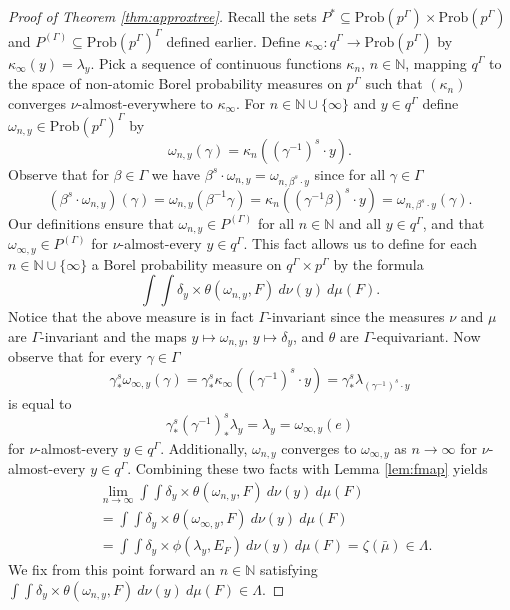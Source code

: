 \documentclass[12pt]{amsart}
\theoremstyle{definition}
\newcommand\bN{{\mathbb N}}
\newcommand{\Prob}{\mathrm{Prob}}
\begin{document}
\begin{proof}[Proof of Theorem \ref{thm:approxtree}]
	Recall the sets $P^* \subseteq \Prob(p^\Gamma) \times \Prob(p^\Gamma)$ and $P^{(\Gamma)} \subseteq \Prob(p^\Gamma)^\Gamma$ defined earlier. Define $\kappa_\infty : q^\Gamma \rightarrow \Prob(p^\Gamma)$ by $\kappa_\infty(y) = \lambda_y$. Pick a sequence of continuous functions $\kappa_n$, $n \in \bN$, mapping $q^\Gamma$ to the space of non-atomic Borel probability measures on $p^\Gamma$ such that $(\kappa_n)$ converges $\nu$-almost-everywhere to $\kappa_\infty$. For $n \in \bN \cup \{\infty\}$ and $y \in q^\Gamma$ define $\omega_{n,y} \in \Prob(p^\Gamma)^\Gamma$ by
	\[\omega_{n,y}(\gamma) = \kappa_n((\gamma^{-1})^s \cdot y).\]
	Observe that for $\beta \in \Gamma$ we have $\beta^s \cdot \omega_{n,y} = \omega_{n, \beta^s \cdot y}$ since for all $\gamma \in \Gamma$
	\[(\beta^s \cdot \omega_{n,y})(\gamma) = \omega_{n,y}(\beta^{-1} \gamma) = \kappa_n((\gamma^{-1} \beta)^s \cdot y) = \omega_{n, \beta^s \cdot y}(\gamma).\]
	Our definitions ensure that $\omega_{n,y} \in P^{(\Gamma)}$ for all $n \in \bN$ and all $y \in q^\Gamma$, and that $\omega_{\infty,y} \in P^{(\Gamma)}$ for $\nu$-almost-every $y \in q^\Gamma$. This fact allows us to define for each $n \in \bN \cup \{\infty\}$ a Borel probability measure on $q^\Gamma \times p^\Gamma$ by the formula
	\[\int \int \delta_y \times \theta(\omega_{n,y}, F) \ d \nu(y) \ d \mu(F).\]
	Notice that the above measure is in fact $\Gamma$-invariant since the measures $\nu$ and $\mu$ are $\Gamma$-invariant and the maps $y \mapsto \omega_{n,y}$, $y \mapsto \delta_y$, and $\theta$ are $\Gamma$-equivariant. Now observe that for every $\gamma \in \Gamma$
	\[\gamma^s_* \omega_{\infty,y}(\gamma) =  \gamma^s_* \kappa_\infty((\gamma^{-1})^s \cdot y) = \gamma^s_* \lambda_{(\gamma^{-1})^s \cdot y}\]
	is equal to
	\[\gamma^s_* (\gamma^{-1})^s_* \lambda_y = \lambda_y = \omega_{\infty, y}(e)\]
	for $\nu$-almost-every $y \in q^\Gamma$. Additionally, $\omega_{n,y}$ converges to $\omega_{\infty, y}$ as $n \rightarrow \infty$ for $\nu$-almost-every $y \in q^\Gamma$. Combining these two facts with Lemma \ref{lem:fmap} yields
	\begin{align*}
		& \lim_{n \rightarrow \infty} \int \int \delta_y \times \theta(\omega_{n,y}, F) \ d \nu(y) \ d \mu(F)\\
		& = \int \int \delta_y \times \theta(\omega_{\infty,y}, F) \ d \nu(y) \ d \mu(F)\\
		& = \int \int \delta_y \times \phi(\lambda_y, E_F) \ d \nu(y) \ d \mu(F) = \zeta(\bar \mu) \in \Lambda.
	\end{align*}
	We fix from this point forward an $n \in \bN$ satisfying $\int \int \delta_y \times \theta(\omega_{n,y}, F) \ d \nu(y) \ d \mu(F) \in \Lambda$.
	

\end{proof}
\end{document}
